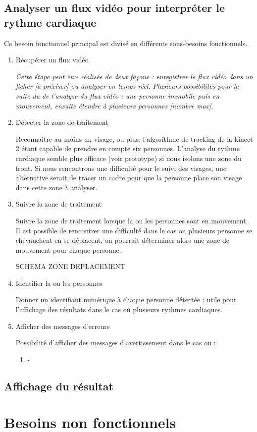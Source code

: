 \documentclass[12pt,a4paper]{article}
\begin{document}
\subsection*{Analyser un flux vidéo pour interpréter le rythme cardiaque}
Ce besoin fonctionnel principal est divisé en différents sous-besoins fonctionnels.
\begin{enumerate}
\item  Récupérer un flux vidéo

\textit{Cette étape peut être réalisée de deux façons : enregistrer le flux vidéo dans un ficher [à préciser] ou analyser en temps réel.
Plusieurs possibilités pour la suite du de l'analyse du flux vidéo : une personne immobile puis en mouvement, ensuite étendre à plusieurs personnes [nombre max].}

\item Détecter la zone de traitement

Reconnaître au moins un visage, ou plus, l'algorithme de tracking de la kinect 2 étant capable de prendre en compte six personnes.
L'analyse du rythme cardiaque semble plus efficace (voir prototype) si nous isolons une zone du front.
Si nous rencontrons une difficulté pour le suivi des visages, une alternative serait de tracer un cadre pour que la personne place son visage dans cette zone à analyser.

\item Suivre la zone de traitement

Suivre la zone de traitement lorsque la ou les personnes sont en mouvement. Il est possible de rencontrer une difficulté dans le cas ou plusieurs personne se   chevauchent en se déplacent, on pourrait déterminer alors une zone de mouvement pour chaque personne.

\begin{Huge}
SCHEMA ZONE DEPLACEMENT
\end{Huge}

\item Identifier la ou les personnes

Donner un identifiant numérique à chaque personne détectée : utile pour l'affichage des résultats dans le cas où plusieurs rythmes cardiaques.

\item Afficher des messages d'erreurs

Possibilité d'afficher des messages d'avertissement dans le cas ou :

\begin{enumerate}
\item [] -

\end{enumerate}

\end{enumerate}
\subsection*{Affichage du résultat}
\section*{Besoins non fonctionnels}
\end{document}

